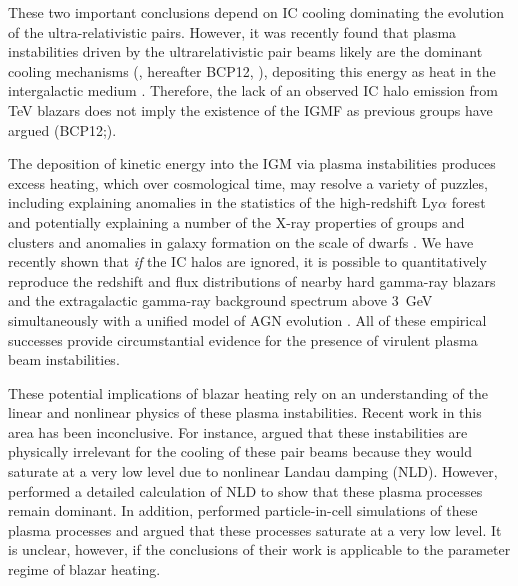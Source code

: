 \documentclass[usenatbib,iop,apj,numberedappendix]{aeb_emulateapj_2015}
\newcommand\qc[1]{{\color{red} \bf #1}}
\begin{document}
These two important conclusions depend on IC cooling dominating the evolution of the ultra-relativistic pairs.  However, it was recently found that plasma instabilities driven by the
ultrarelativistic pair beams  likely are the dominant cooling mechanisms
(\citealt{paperI}, hereafter BCP12, \citealt{Schlickeiser+12,Schlickeiser+13}), depositing this energy
as heat in the intergalactic medium \citep{paperII,paperIII}.  Therefore, the lack of an observed
 IC halo emission from TeV blazars does not imply the existence of the IGMF as previous groups have argued
(BCP12;\citealt{Schlickeiser+12,Schlickeiser+13}).


The deposition of kinetic energy into the IGM via plasma instabilities produces excess heating, which over cosmological time, may resolve a variety
of puzzles, including explaining
anomalies in the statistics of the high-redshift Ly$\alpha$ forest
\citep{paperIV,2015ApJ...811...19L} and potentially explaining a number of the X-ray
properties of groups and clusters and anomalies in galaxy formation on
the scale of dwarfs \citep{paperIII,Lu+2013}.  We
have recently shown that \textit{if} the IC halos are ignored, it is possible
to quantitatively reproduce the redshift and flux distributions
of nearby hard gamma-ray blazars and the extragalactic gamma-ray background
spectrum above 3~GeV simultaneously with a unified model of AGN evolution
\citep{Broderick+2013,Broderick+2013b}.  All of these empirical successes provide
circumstantial evidence for the presence of virulent plasma beam
instabilities. 

These potential implications of blazar heating rely on an understanding of the linear and nonlinear physics of these plasma instabilities.  Recent work in this area has been inconclusive.  For instance, \citet{Miniati+12} argued that these instabilities are physically irrelevant for the cooling of these pair beams because they would saturate at a very low level due to nonlinear Landau damping (NLD).  However, \citet{Chang+14} performed a detailed calculation of NLD to show that these plasma processes remain dominant.  In addition, \citet{Sironi+14} performed particle-in-cell simulations of these plasma processes and argued that these processes saturate at a very low level.  It is unclear, however, if the conclusions of their work is applicable to the parameter regime of blazar heating.
\end{document}
